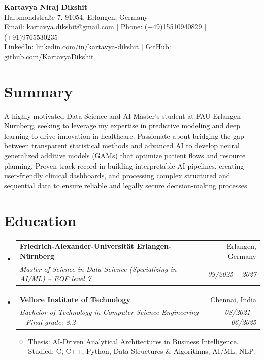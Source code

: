 \documentclass[10pt,a4paper]{article}
\makeatletter
\newcommand{\resumeItem}[1]{\item\small{#1}}
\newcommand{\resumeSubheading}[4]{
  \vspace{-1pt}\item
    \begin{tabular*}{1.0\textwidth}[t]{l@{\extracolsep{\fill}}r}
      \textbf{#1} & #2 \\
      \textit{\small#3} & \textit{\small #4} \\
    \end{tabular*}\vspace{-5pt}
}
\makeatother
\begin{document}
\begin{center}
    \textbf{\huge \color{primary} Kartavya Niraj Dikshit} \\ \vspace{5pt}
    \small Halbmondstraße 7, 91054, Erlangen, Germany \\
    \small Email: \href{mailto:kartavya.dikshit@gmail.com}{kartavya.dikshit@gmail.com} $|$ Phone: (+49)15510940829 $|$ (+91)9765530235 \\
    \small LinkedIn: \href{https://www.linkedin.com/in/kartavya-dikshit}{linkedin.com/in/kartavya-dikshit} $|$ GitHub: \href{https://github.com/KartavyaDikshit}{github.com/KartavyaDikshit}
\end{center}

\section{Summary}
A highly motivated Data Science and AI Master's student at FAU Erlangen-Nürnberg, seeking to leverage my expertise in predictive modeling and deep learning to drive innovation in healthcare. Passionate about bridging the gap between transparent statistical methods and advanced AI to develop neural generalized additive models (GAMs) that optimize patient flows and resource planning. Proven track record in building interpretable AI pipelines, creating user-friendly clinical dashboards, and processing complex structured and sequential data to ensure reliable and legally secure decision-making processes.

\section{Education}
\begin{itemize}[leftmargin=0.15in, label={}]
    \resumeSubheading
      {Friedrich-Alexander-Universität Erlangen-Nürnberg}{Erlangen, Germany}
      {Master of Science in Data Science (Specializing in AI/ML) -- EQF level 7}{09/2025 -- 2027}
    \resumeSubheading
      {Vellore Institute of Technology}{Chennai, India}
      {Bachelor of Technology in Computer Science Engineering -- Final grade: 8.2}{08/2021 -- 06/2025}
      \begin{itemize}[leftmargin=0.15in, label={\textbullet}]
        \resumeItem{Thesis: AI-Driven Analytical Architectures in Business Intelligence. Studied: C, C++, Python, Data Structures \& Algorithms, AI/ML, NLP.}
      \end{itemize}
\end{itemize}
\end{document}
